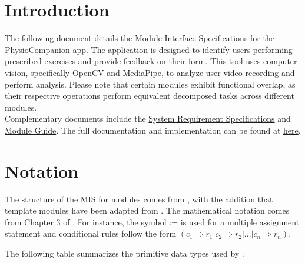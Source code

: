 \documentclass[12pt, titlepage]{article}
\begin{document}
\newpage


\section{Introduction}

The following document details the Module Interface Specifications for the PhysioCompanion app. The application is 
designed to identify users performing prescribed exercises and provide feedback on their form. This tool uses computer
vision, specifically OpenCV and MediaPipe, to analyze user video recording and perform analysis. Please note that certain
modules exhibit functional overlap, as their respective operations perform equivalent decomposed tasks across different 
modules. \\

Complementary documents include the \href{https://github.com/M9Huynh/technically-functional/blob/main/docs/SRS/SRS.pdf}{System Requirement Specifications}
and \href{https://github.com/M9Huynh/technically-functional/blob/main/docs/Design/SoftArchitecture/MG.pdf}{Module Guide}.  The full documentation and implementation can be
found at \href{https://github.com/M9Huynh/technically-functional}{here}.  

\section{Notation}

The structure of the MIS for modules comes from \citet{HoffmanAndStrooper1995},
with the addition that template modules have been adapted from
\cite{GhezziEtAl2003}.  The mathematical notation comes from Chapter 3 of
\citet{HoffmanAndStrooper1995}.  For instance, the symbol := is used for a
multiple assignment statement and conditional rules follow the form $(c_1
\Rightarrow r_1 | c_2 \Rightarrow r_2 | ... | c_n \Rightarrow r_n )$.

The following table summarizes the primitive data types used by \progname. 
\end{document}
